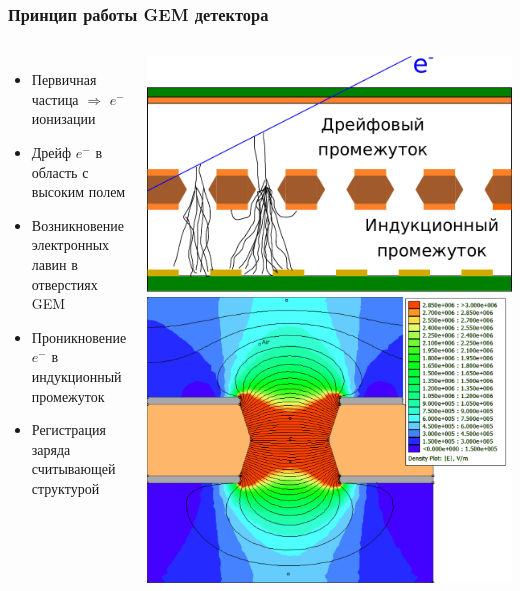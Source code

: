 \documentclass[14pt]{beamer}
\begin{document}
\begin{frame}[t]
\frametitle{Принцип работы GEM детектора}
\vspace{0pt}
\begin{columns}
\begin{minipage}[t][1\textheight]{\linewidth}
	\small{\begin{itemize}
			\item Первичная частица $\Rightarrow$ $e^-$ ионизации
			\item Дрейф $e^-$ в область с высоким полем
			\item Возникновение электронных лавин в отверстиях GEM
			\item Проникновение $e^-$ в индукционный промежуток
			\item Регистрация заряда считывающей структурой
	\end{itemize}}
\end{minipage}%
\begin{minipage}[t][1\textheight]{\linewidth}
	\center \includegraphics[width=0.9\linewidth]{GEM_scheme.pdf}
	\vspace*{0pt}
	\center \includegraphics[width=0.6\linewidth]{GEM_field.pdf}	
\end{minipage}%
\end{columns}
\end{frame}
\end{document}

